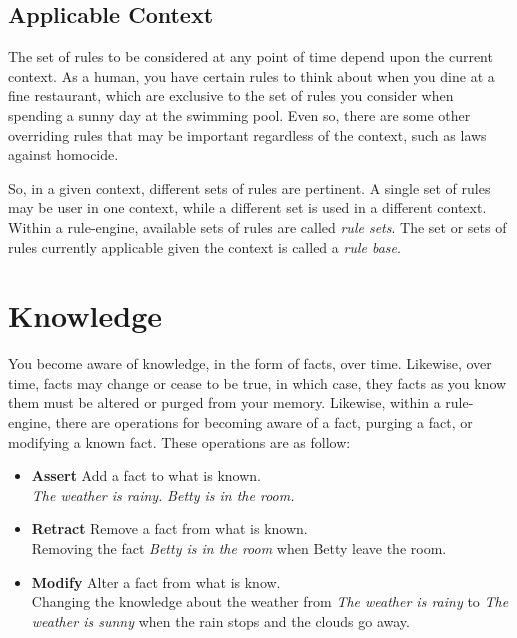 \subsection{Applicable Context}

The set of rules to be considered at any point of time depend upon the
current context.  As a human, you have certain rules to think about
when you dine at a fine restaurant, which are exclusive to the set of
rules you consider when spending a sunny day at the swimming pool.
Even so, there are some other overriding rules that may be important
regardless of the context, such as laws against homocide.

So, in a given context, different sets of rules are pertinent.  A
single set of rules may be user in one context, while a different set
is used in a different context. Within a rule-engine, available sets 
of rules are called \emph{rule sets}.  The set or 
sets of rules currently applicable given the context is called a 
\emph{rule base}.

\section{Knowledge}

You become aware of knowledge, in the form of facts, over time.
Likewise, over time, facts may change or cease to be true, in 
which case, they facts as you know them must be altered or purged
from your memory.  Likewise, within a rule-engine, there are
operations for becoming aware of a fact, purging a fact, or
modifying a known fact.  These operations are as follow:

\begin{itemize}
  \item \textbf{Assert} Add a fact to what is known.\\
    \emph{The weather is rainy.} \emph{Betty is in the room.}
  \item \textbf{Retract} Remove a fact from what is known.\\
    Removing the fact \emph{Betty is in the room} when Betty leave the
    room.
  \item \textbf{Modify} Alter a fact from what is know.\\
    Changing the knowledge about the weather from \emph{The weather is
    rainy} to \emph{The weather is sunny} when the rain stops and the
    clouds go away.
\end{itemize}

